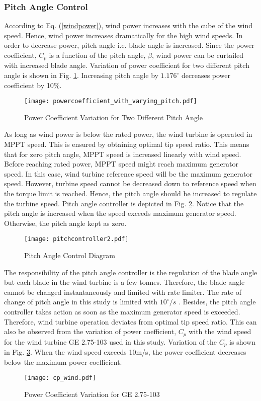 \subsubsection{Pitch Angle Control}
According to Eq. (\ref{windpower}), wind power increases with the cube of the wind speed. Hence, wind power increases dramatically for the high wind speeds. In order to decrease power, pitch angle i.e. blade angle is increased. Since the power coefficient, $C_{p}$ is a function of the pitch angle, $\beta$, wind power can be curtailed with increased blade angle. Variation of power coefficient for two different pitch angle is shown in Fig. \ref{cpwithtwopitchangle}. Increasing pitch angle by $1.176^{\circ}$ decreases power coefficient by 10\%.\par
\begin{figure}[h!]
	\centering
	\texttt{[image: powercoefficient\_with\_varying\_pitch.pdf]}
	\caption{Power Coefficient Variation for Two Different Pitch Angle}
	\label{cpwithtwopitchangle}
\end{figure} 
As long as wind power is below the rated power, the wind turbine is operated in MPPT speed. This is ensured by obtaining optimal tip speed ratio. This means that for zero pitch angle, MPPT speed is increased linearly with wind speed. Before reaching rated power, MPPT speed might reach maximum generator speed. In this case, wind turbine reference speed will be the maximum generator speed. However, turbine speed cannot be decreased down to reference speed when the torque limit is reached. Hence, the pitch angle should be increased to regulate the turbine speed. Pitch angle controller is depicted in Fig. \ref{pitchcontroller}. Notice that the pitch angle is increased when the speed exceeds maximum generator speed. Otherwise, the pitch angle kept as zero.\par
\begin{figure}[h]
	\centering
	\texttt{[image: pitchcontroller2.pdf]}
	\caption{Pitch Angle Control Diagram}
	\label{pitchcontroller}
\end{figure}
The responsibility of the pitch angle controller is the regulation of the blade angle but each blade in the wind turbine is a few tonnes. Therefore, the blade angle cannot be changed instantaneously and limited with rate limiter. The rate of change of pitch angle in this study is limited with $10^{\circ}/s$ \cite{Ackermann2005a}. Besides, the pitch angle controller takes action as soon as the maximum generator speed is exceeded. Therefore, wind turbine operation deviates from optimal tip speed ratio. This can also be observed from the variation of power coefficient, $C_{p}$ with the wind speed for the wind turbine GE 2.75-103 used in this study. Variation of the $C_{p}$ is shown in Fig. \ref{powercoefficientge}. When the wind speed exceeds 10m/s, the power coefficient decreases below the maximum power coefficient.
\begin{figure}[h!]
	\centering
	\texttt{[image: cp\_wind.pdf]}
	\caption{Power Coefficient Variation for GE 2.75-103}
	\label{powercoefficientge}
\end{figure}
